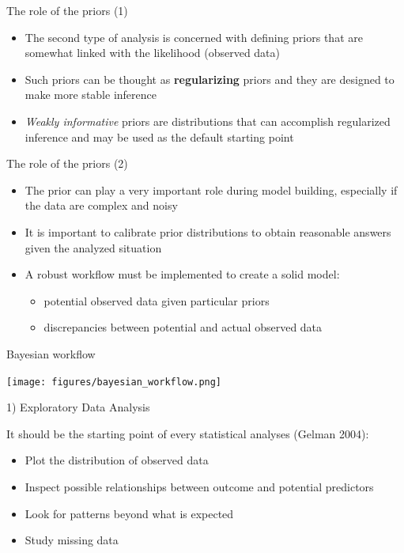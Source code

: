 \documentclass[ignorenonframetext,a4paper]{beamer}
\providecommand{\tightlist}{%
  \setlength{\itemsep}{0pt}\setlength{\parskip}{0pt}}
\begin{document}
\begin{frame}{The role of the priors (1)}

\begin{itemize}
\item
  The second type of analysis is concerned with defining priors that are
  somewhat linked with the likelihood (observed data)
\item
  Such priors can be thought as \textbf{regularizing} priors and they
  are designed to make more stable inference
\item
  \emph{Weakly informative} priors are distributions that can accomplish
  regularized inference and may be used as the default starting point
\end{itemize}

\end{frame}

\begin{frame}{The role of the priors (2)}

\begin{itemize}
\item
  The prior can play a very important role during model building,
  especially if the data are complex and noisy
\item
  It is important to calibrate prior distributions to obtain reasonable
  answers given the analyzed situation
\item
  A robust workflow must be implemented to create a solid model:

  \begin{itemize}
  \tightlist
  \item
    potential observed data given particular priors
  \item
    discrepancies between potential and actual observed data
  \end{itemize}
\end{itemize}

\end{frame}

\begin{frame}{Bayesian workflow}

\texttt{[image: figures/bayesian\_workflow.png]}

\end{frame}

\begin{frame}{1) Exploratory Data Analysis}

It should be the starting point of every statistical analyses (Gelman
2004):

\begin{itemize}
\setlength\itemsep{1em}
  \item{Plot the distribution of observed data}
  \item{Inspect possible relationships between outcome and potential
        predictors}
  \item{Look for patterns beyond what is expected}
  \item{Study missing data}
\end{itemize}

\end{frame}
\end{document}
